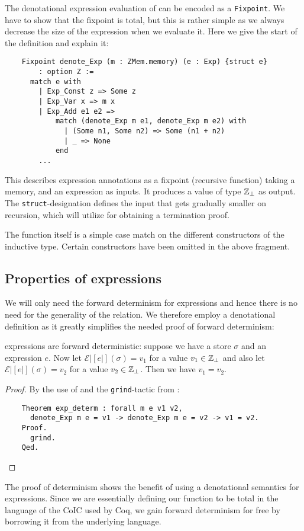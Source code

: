 The denotational expression evaluation of \janusz{} can be encoded as a
\texttt{Fixpoint}. We have to show that the fixpoint is total, but
this is rather simple as we always decrease the size of the expression
when we evaluate it. Here we give the start of the definition and
explain it:
\begin{verbatim}
    Fixpoint denote_Exp (m : ZMem.memory) (e : Exp) {struct e}
        : option Z :=
      match e with
        | Exp_Const z => Some z
        | Exp_Var x => m x
        | Exp_Add e1 e2 =>
            match (denote_Exp m e1, denote_Exp m e2) with
              | (Some n1, Some n2) => Some (n1 + n2)
              | _ => None
            end
        ...
\end{verbatim}
This describes expression annotations as a fixpoint (recursive
function) taking a memory, and an expression as inputs. It produces a
value of type $\mathbb{Z}_{\perp}$ as output. The
\texttt{struct}-designation defines the input that gets gradually
smaller on recursion, which \coq{} will utilize for obtaining a
termination proof.

The function itself is a simple case match on the different
constructors of the inductive type. Certain constructors have been
omitted in the above fragment.

\subsection{Properties of \janusz{} expressions}

We will only need the forward determinism for expressions and hence
there is no need for the generality of the relation. We therefore
employ a denotational definition as it greatly simplifies the needed
proof of forward determinism:

\begin{thm}
  \janusz{} expressions are forward deterministic: suppose we have a
  store $\sigma$ and an expression $e$. Now let
  $\mathcal{E}|[e|](\sigma) = v_1$ for a value $v_1 \in \mathbb{Z}_{\perp}$
  and also let $\mathcal{E}|[e|](\sigma) = v_2$ for a value $v_2 \in
  \mathbb{Z}_{\perp}$. Then we have $v_1 = v_2$.
\end{thm}
\begin{proof}
By the use of \coq{} and the \texttt{grind}-tactic from
\cite{chlipala+08:cpdt}:
\begin{verbatim}
    Theorem exp_determ : forall m e v1 v2,
      denote_Exp m e = v1 -> denote_Exp m e = v2 -> v1 = v2.
    Proof.
      grind.
    Qed.
\end{verbatim}
\end{proof}
The proof of determinism shows the benefit of using a denotational
semantics for expressions. Since we are essentially defining our
function to be total in the language of the CoIC used by Coq, we gain
forward determinism for free by borrowing it from the underlying
language.

